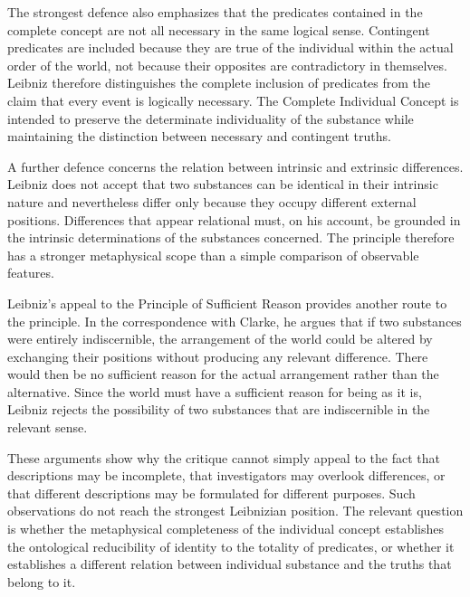 \label{para:VS.B01.P01.C08.S07.SS07.P002}

The strongest defence also emphasizes that the
predicates contained in the complete concept
are not all necessary in the same logical
sense. Contingent predicates are included
because they are true of the individual
within the actual order of the world, not
because their opposites are contradictory
in themselves. Leibniz therefore distinguishes
the complete inclusion of predicates from
the claim that every event is logically
necessary. The Complete Individual Concept
is intended to preserve the determinate
individuality of the substance while
maintaining the distinction between
necessary and contingent truths. \cite[§13]{LeibnizDiscourse}

\label{para:VS.B01.P01.C08.S07.SS07.P003}

A further defence concerns the relation between
intrinsic and extrinsic differences. Leibniz
does not accept that two substances can be
identical in their intrinsic nature and
nevertheless differ only because they occupy
different external positions. Differences
that appear relational must, on his account,
be grounded in the intrinsic determinations
of the substances concerned. The principle
therefore has a stronger metaphysical scope
than a simple comparison of observable
features. \cite[II.xxvii]{LeibnizNewEssays}
\cite{LookLeibnizSEP2020}
\cite{RodriguezPereyraIdentitySEP2025}

\label{para:VS.B01.P01.C08.S07.SS07.P004}

Leibniz's appeal to the Principle of Sufficient
Reason provides another route to the principle.
In the correspondence with Clarke, he argues
that if two substances were entirely
indiscernible, the arrangement of the world
could be altered by exchanging their
positions without producing any relevant
difference. There would then be no sufficient
reason for the actual arrangement rather
than the alternative. Since the world must
have a sufficient reason for being as it is,
Leibniz rejects the possibility of two
substances that are indiscernible in the
relevant sense. \cite[L.V.21]{LeibnizClarkeCorrespondence}
\cite{RodriguezPereyraIdentitySEP2025}

\label{para:VS.B01.P01.C08.S07.SS07.P005}

These arguments show why the critique cannot
simply appeal to the fact that descriptions
may be incomplete, that investigators may
overlook differences, or that different
descriptions may be formulated for different
purposes. Such observations do not reach
the strongest Leibnizian position. The
relevant question is whether the metaphysical
completeness of the individual concept
establishes the ontological reducibility
of identity to the totality of predicates,
or whether it establishes a different relation
between individual substance and the truths
that belong to it.


